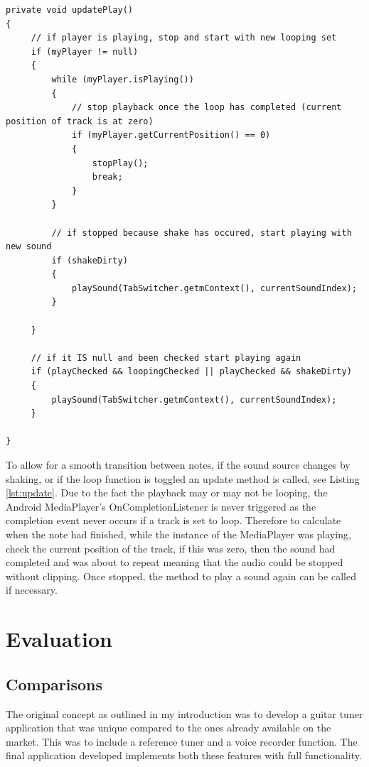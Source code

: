 \documentclass[conference]{acmsiggraph}
\begin{document}
\begin{lstlisting}[label = {lst:update}, caption={Method to stop playing gracefully when looping or shake has occured.}]
 private void updatePlay()
{
	 // if player is playing, stop and start with new looping set
	 if (myPlayer != null)
	 {
		 while (myPlayer.isPlaying())
		 {
			 // stop playback once the loop has completed (current position of track is at zero)
			 if (myPlayer.getCurrentPosition() == 0)
		     {
				 stopPlay();
				 break;
			 }
		 }
 
		 // if stopped because shake has occured, start playing with new sound
		 if (shakeDirty)
		 {
			 playSound(TabSwitcher.getmContext(), currentSoundIndex);
		 }
 
	 }
	 
	 // if it IS null and been checked start playing again 
	 if (playChecked && loopingChecked || playChecked && shakeDirty)    
	 {
		 playSound(TabSwitcher.getmContext(), currentSoundIndex);
	 }
 
}
\end{lstlisting}


To allow for a smooth transition between notes, if the sound source changes by shaking, or if the loop function is toggled an update method is called, see Listing \ref{lst:update}. Due to the fact the playback may or may not be looping, the Android MediaPlayer's OnCompletionListener is never triggered as the completion event never occurs if a track is set to loop. Therefore to calculate when the note had finished, while the instance of the MediaPlayer was playing, check the current position of the track, if this was zero, then the sound had completed and was about to repeat meaning that the audio could be stopped without clipping. Once stopped, the method to play a sound again can be called if necessary.

\section{Evaluation}

\subsection{Comparisons}

The original concept as outlined in my introduction was to develop a guitar tuner application that was unique compared to the ones already available on the market. This was to include a reference tuner and a voice recorder function. The final application developed implements both these features with full functionality. 
\end{document}
